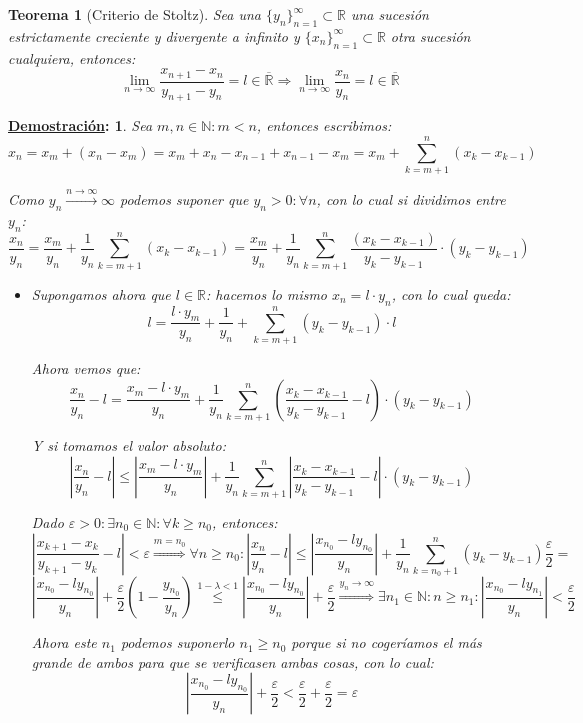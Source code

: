 \documentclass[10pt,a4paper,openright]{book}
\theoremstyle{break}
\newtheorem*{theo}{Teorema}
\newtheorem*{demo}{\underline{Demostración}:}
\begin{document}
\begin{theo}[Criterio de Stoltz]
Sea una $\{y_n\}_{n=1}^\infty\subset \mathbb R$ una sucesión estrictamente creciente y divergente a infinito y $\{x_n\}_{n=1}^\infty\subset \mathbb R$ otra sucesión cualquiera, entonces:
$$\lim_{n\rightarrow \infty} \frac{x_{n+1}-x_n}{y_{n+1}-y_n}=l\in \overline{\mathbb R}\Rightarrow \lim_{n\rightarrow \infty} \frac{x_n}{y_n}=l\in \overline{\mathbb R}$$
\end{theo}
\begin{demo}
Sea $m,n\in \mathbb N: m<n$, entonces escribimos:
$$x_n=x_m+(x_n-x_m)=x_m+x_n-x_{n-1}+x_{n-1}-x_m=x_m+\sum_{k=m+1}^n (x_k-x_{k-1})$$

Como $y_n\stackrel{n\rightarrow\infty}{\rightarrow} \infty$ podemos suponer que $y_n>0: \forall n$, con lo cual si dividimos entre $y_n$:
$$\frac{x_n}{y_n}=\frac{x_m}{y_n}+\frac{1}{y_n}\sum_{k=m+1}^n (x_k-x_{k-1})=\frac{x_m}{y_n}+\frac{1}{y_n}\sum_{k=m+1}^n \frac{(x_k-x_{k-1})}{y_k-y_{k-1}}\cdot (y_k-y_{k-1})$$

\begin{itemize}
\item Supongamos ahora que $l\in \mathbb R$: hacemos lo mismo $x_n=l\cdot y_n$, con lo cual queda:
$$l=\frac{l\cdot y_m}{y_n}+\frac{1}{y_n}+\sum_{k=m+1}^n (y_k-y_{k-1})\cdot l$$

Ahora vemos que:
$$\frac{x_n}{y_n}-l=\frac{x_m-l\cdot y_m}{y_n}+\frac{1}{y_n}\sum_{k=m+1}^n \left(\frac{x_k-x_{k-1}}{y_k-y_{k-1}}-l\right)\cdot (y_k-y_{k-1})$$

Y si tomamos el valor absoluto:
$$\left|\frac{x_n}{y_n}-l\right|\leq \left|\frac{x_m-l\cdot y_m}{y_n}\right|+\frac{1}{y_n}\sum_{k=m+1}^n \left|\frac{x_k-x_{k-1}}{y_k-y_{k-1}}-l\right|\cdot (y_k-y_{k-1})$$

Dado $\varepsilon>0: \exists n_0\in \mathbb N: \forall k\geq n_0$, entonces:
$$\left|\frac{x_{k+1}-x_k}{y_{k+1}-y_k}-l\right|<\varepsilon\stackrel{m=n_0}{\Rightarrow} \forall n\geq n_0: \left|\frac{x_n}{y_n}-l\right|\leq \left|\frac{x_{n_0}-ly_{n_0}}{y_n}\right|+\frac{1}{y_n}\sum_{k=n_0+1}^n (y_k-y_{k-1})\frac{\varepsilon}{2}=$$
$$\left|\frac{x_{n_0}-ly_{n_0}}{y_n}\right|+\frac{\varepsilon}{2}\left(1-\frac{y_{n_0}}{y_n}\right)\stackrel{1-\lambda<1}{\leq} \left|\frac{x_{n_0}-ly_{n_0}}{y_n}\right|+\frac{\varepsilon}{2}\stackrel{y_n\rightarrow\infty}{\Rightarrow} \exists n_1\in \mathbb N: n\geq n_1: \left|\frac{x_{n_0}-ly_{n_1}}{y_n}\right|<\frac{\varepsilon}{2}$$

Ahora este $n_1$ podemos suponerlo $n_1\geq n_0$ porque si no cogeríamos el más grande de ambos para que se verificasen ambas cosas, con lo cual:
$$\left|\frac{x_{n_0}-ly_{n_0}}{y_n}\right|+\frac{\varepsilon}{2}<\frac{\varepsilon}{2}+\frac{\varepsilon}{2}=\varepsilon $$


\end{itemize}
\end{demo}
\end{document}
